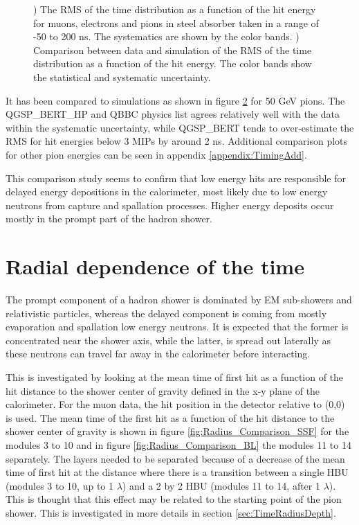 \begin{figure}[htbp!]
\begin{subfigure}[t]{0.49\textwidth}
		\caption{} \label{fig:RMS_SimData_50GeV}
	\end{subfigure}
	\caption{) The RMS of the time distribution as a function of the hit energy for muons, electrons and pions in steel absorber taken in a range of -50 to 200 ns. The systematics are shown by the color bands. ) Comparison between data and simulation of the RMS of the time distribution as a function of the hit energy. The color bands show the statistical and systematic uncertainty.}
\end{figure}

It has been compared to simulations as shown in figure \ref{fig:RMS_SimData_50GeV} for 50 GeV pions. The QGSP\-\_BERT\-\_HP and QBBC physics list agrees relatively well with the data within the systematic uncertainty, while QGSP\_BERT tends to over-estimate the RMS for hit energies below 3 MIPs by around 2 ns. Additional comparison plots for other pion energies can be seen in appendix \ref{appendix:TimingAdd}.

This comparison study seems to confirm that low energy hits are responsible for delayed energy depositions in the calorimeter, most likely due to low energy neutrons from capture and spallation processes. Higher energy deposits occur mostly in the prompt part of the hadron shower.

\section{Radial dependence of the time}
\label{sec:RadialTime}

The prompt component of a hadron shower is dominated by EM sub-showers and relativistic particles, whereas the delayed component is coming from mostly evaporation and spallation low energy neutrons. It is expected that the former is concentrated near the shower axis, while the latter, is spread out laterally as these neutrons can travel far away in the calorimeter before interacting.

This is investigated by looking at the mean time of first hit as a function of the hit distance to the shower center of gravity defined in the x-y plane of the calorimeter. For the muon data, the hit position in the detector relative to (0,0) is used. The mean time of the first hit as a function of the hit distance to the shower center of gravity is shown in figure \ref{fig:Radius_Comparison_SSF} for the modules 3 to 10 and in figure \ref{fig:Radius_Comparison_BL} the modules 11 to 14 separately. The layers needed to be separated because of a decrease of the mean time of first hit at the distance where there is a transition between a single HBU (modules 3 to 10, up to 1 $\lambda$) and a 2 by 2 HBU (modules 11 to 14, after 1 $\lambda$). This is thought that this effect may be related to the starting point of the pion shower. This is investigated in more details in section \ref{sec:TimeRadiusDepth}.

